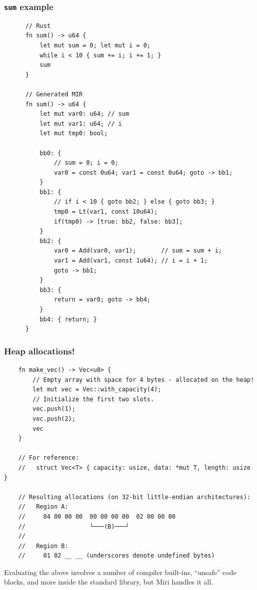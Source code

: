 \documentclass{beamer}
\begin{document}
\begin{frame}[fragile]
  \frametitle{\texttt{sum} example}
  \begin{center}
    \begin{verbatim}
      // Rust
      fn sum() -> u64 {
          let mut sum = 0; let mut i = 0;
          while i < 10 { sum += i; i += 1; }
          sum
      }

      // Generated MIR
      fn sum() -> u64 {
          let mut var0: u64; // sum
          let mut var1: u64; // i
          let mut tmp0: bool;

          bb0: {
              // sum = 0; i = 0;
              var0 = const 0u64; var1 = const 0u64; goto -> bb1;
          }
          bb1: {
              // if i < 10 { goto bb2; } else { goto bb3; }
              tmp0 = Lt(var1, const 10u64);
              if(tmp0) -> [true: bb2, false: bb3];
          }
          bb2: {
              var0 = Add(var0, var1);       // sum = sum + i;
              var1 = Add(var1, const 1u64); // i = i + 1;
              goto -> bb1;
          }
          bb3: {
              return = var0; goto -> bb4;
          }
          bb4: { return; }
      }
    \end{verbatim}
  \end{center}
\end{frame}

\begin{frame}[fragile]
  \frametitle{Heap allocations!}
  \begin{verbatim}
    fn make_vec() -> Vec<u8> {
        // Empty array with space for 4 bytes - allocated on the heap!
        let mut vec = Vec::with_capacity(4);
        // Initialize the first two slots.
        vec.push(1);
        vec.push(2);
        vec
    }

    // For reference:
    //   struct Vec<T> { capacity: usize, data: *mut T, length: usize }

    // Resulting allocations (on 32-bit little-endian architectures):
    //   Region A:
    //     04 00 00 00  00 00 00 00  02 00 00 00
    //                  └───(B)───┘
    //
    //   Region B:
    //     01 02 __ __ (underscores denote undefined bytes)
  \end{verbatim}

  \footnotesize{Evaluating the above involves a number of compiler built-ins,
  ``unsafe'' code blocks, and more inside the standard library,
  but Miri handles it all.}
\end{frame}
\end{document}
